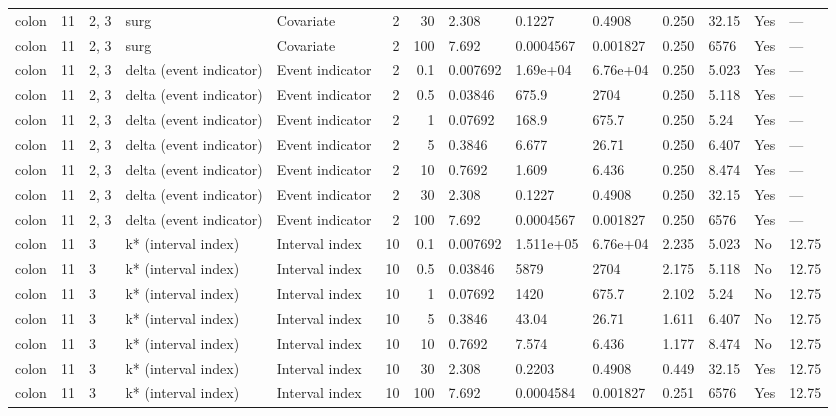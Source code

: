 \begin{tabular}{lrlllrrlllllll}
  colon & 11 & 2, 3 & surg & Covariate & 2 &    30 & 2.308 & 0.1227 & 0.4908 & 0.250 & 32.15 & Yes & --- \\ 
  colon & 11 & 2, 3 & surg & Covariate & 2 &   100 & 7.692 & 0.0004567 & 0.001827 & 0.250 & 6576 & Yes & --- \\ 
  colon & 11 & 2, 3 & delta (event indicator) & Event indicator & 2 &   0.1 & 0.007692 & 1.69e+04 & 6.76e+04 & 0.250 & 5.023 & Yes & --- \\ 
  colon & 11 & 2, 3 & delta (event indicator) & Event indicator & 2 &   0.5 & 0.03846 & 675.9 & 2704 & 0.250 & 5.118 & Yes & --- \\ 
  colon & 11 & 2, 3 & delta (event indicator) & Event indicator & 2 &     1 & 0.07692 & 168.9 & 675.7 & 0.250 & 5.24 & Yes & --- \\ 
  colon & 11 & 2, 3 & delta (event indicator) & Event indicator & 2 &     5 & 0.3846 & 6.677 & 26.71 & 0.250 & 6.407 & Yes & --- \\ 
  colon & 11 & 2, 3 & delta (event indicator) & Event indicator & 2 &    10 & 0.7692 & 1.609 & 6.436 & 0.250 & 8.474 & Yes & --- \\ 
  colon & 11 & 2, 3 & delta (event indicator) & Event indicator & 2 &    30 & 2.308 & 0.1227 & 0.4908 & 0.250 & 32.15 & Yes & --- \\ 
  colon & 11 & 2, 3 & delta (event indicator) & Event indicator & 2 &   100 & 7.692 & 0.0004567 & 0.001827 & 0.250 & 6576 & Yes & --- \\ 
  colon & 11 & 3 & k* (interval index) & Interval index & 10 &   0.1 & 0.007692 & 1.511e+05 & 6.76e+04 & 2.235 & 5.023 & No & 12.75 \\ 
  colon & 11 & 3 & k* (interval index) & Interval index & 10 &   0.5 & 0.03846 & 5879 & 2704 & 2.175 & 5.118 & No & 12.75 \\ 
  colon & 11 & 3 & k* (interval index) & Interval index & 10 &     1 & 0.07692 & 1420 & 675.7 & 2.102 & 5.24 & No & 12.75 \\ 
  colon & 11 & 3 & k* (interval index) & Interval index & 10 &     5 & 0.3846 & 43.04 & 26.71 & 1.611 & 6.407 & No & 12.75 \\ 
  colon & 11 & 3 & k* (interval index) & Interval index & 10 &    10 & 0.7692 & 7.574 & 6.436 & 1.177 & 8.474 & No & 12.75 \\ 
  colon & 11 & 3 & k* (interval index) & Interval index & 10 &    30 & 2.308 & 0.2203 & 0.4908 & 0.449 & 32.15 & Yes & 12.75 \\ 
  colon & 11 & 3 & k* (interval index) & Interval index & 10 &   100 & 7.692 & 0.0004584 & 0.001827 & 0.251 & 6576 & Yes & 12.75 \\ 

\end{tabular}
